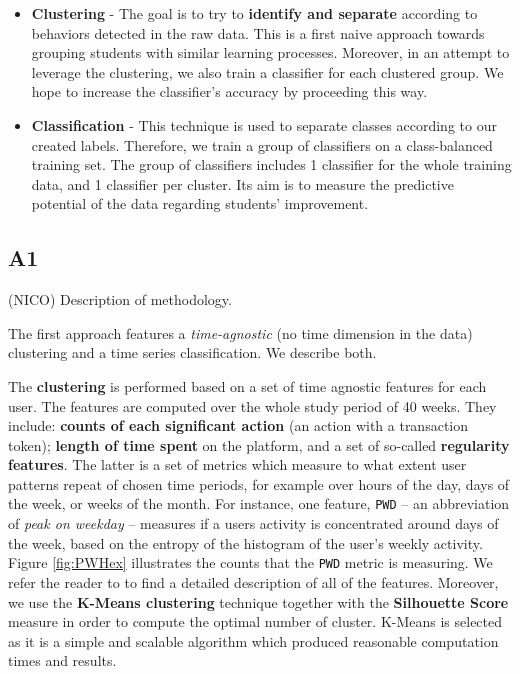 \documentclass[sigplan,screen]{acmart}
\begin{document}
\begin{itemize}
    \item \textbf{Clustering} - The goal is to try to \textbf{identify and separate} according to behaviors detected in the raw data. This is a first naive approach towards grouping students with similar learning processes. Moreover, in an attempt to leverage the clustering, we also train a classifier for each clustered group. We hope to increase the classifier's accuracy by proceeding this way.
    \item \textbf{Classification} - This technique is used to separate classes according to our created labels. Therefore, we train a group of classifiers on a class-balanced training set. The group of classifiers includes 1 classifier for the whole training data, and 1 classifier per cluster. Its aim is to measure the predictive potential of the data regarding students' improvement. %
\end{itemize}

\subsection{A1}\label{subsec:A1}
{\color{red} (NICO) Description of methodology.}

The first approach features a \textit{time-agnostic} (no time dimension in the data) clustering and a time series classification. We describe both.

The \textbf{clustering} is performed based on a set of time agnostic features for each user. The features are computed over the whole study period of 40 weeks. They include: \textbf{counts of each significant action} (an action with a transaction token); \textbf{length of time spent} on the platform, and a set of so-called \textbf{regularity features}\cite{quantifyreg}. The latter is a set of metrics which measure to what extent user patterns repeat of chosen time periods, for example over hours of the day, days of the week, or weeks of the month. For instance, one feature, \texttt{PWD} -- an abbreviation of \textit{peak on weekday} -- measures if a users activity is concentrated around days of the week, based on the entropy of the histogram of the user's weekly activity. Figure \ref{fig:PWHex} illustrates the counts that the \texttt{PWD} metric is measuring. We refer the reader to \cite{quantifyreg} to find a detailed description of all of the features. Moreover, we use the \textbf{K-Means clustering} technique together with the \textbf{Silhouette Score} measure in order to compute the optimal number of cluster. K-Means is selected as it is a simple and scalable algorithm which produced reasonable computation times and results.
\end{document}
